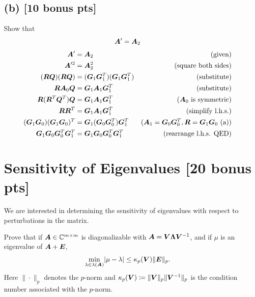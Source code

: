 \documentclass[twoside,10pt]{article}
\begin{document}
\subsection*{(b) [10 bonus pts]}
Show that
\begin{equation}
  \bm{A}' = \bm{A}_2
\end{equation}
\begin{align*}
  \bm{A}' &= \bm{A}_2&\text{(given)}\\
  \bm{A}'^2 &= \bm{A}_2^2&\text{(square both sides)}\\
  (\bm{R}\bm{Q})(\bm{R}\bm{Q}) &= (\bm{G}_1\bm{G}_1^T)(\bm{G}_1\bm{G}_1^T)&\text{(substitute)}\\
  \bm{R}\bm{A}_0\bm{Q} &= \bm{G}_1\bm{A}_1\bm{G}_1^T&\text{(substitute)}\\
  \bm{R}(\bm{R}^T\bm{Q}^T)\bm{Q} &= \bm{G}_1\bm{A}_1\bm{G}_1^T&\text{($\bm{A}_0$ is symmetric)}\\
  \bm{R}\bm{R}^T &= \bm{G}_1\bm{A}_1\bm{G}_1^T&\text{(simplify l.h.s.)}\\
  (\bm{G}_1 \bm{G}_0)(\bm{G}_1 \bm{G}_0)^T &= \bm{G}_1(\bm{G}_0 \bm{G}_0^T)\bm{G}_1^T&\text{($\bm{A}_{1} = \bm{G}_0 \bm{G}_0^T, \bm{R} = \bm{G}_1\bm{G}_0$ (a))}\\
  \bm{G}_1 \bm{G}_0\bm{G}_0^T \bm{G}_1^T &= \bm{G}_1\bm{G}_0 \bm{G}_0^T\bm{G}_1^T&\text{(rearrange l.h.s. QED)}\\
\end{align*}

\section{Sensitivity of Eigenvalues [20 bonus pts]}
We are interested in determining the sensitivity of eigenvalues with respect to perturbations in the matrix.

Prove that if $\bm{A} \in \mathbb{C}^{m \times m}$ is diagonalizable with $\bm{A} = \bm{V} \bm{\Lambda} \bm{V}^{-1}$, and if $\mu$ is an eigenvalue of $\bm{A} + \bm{E}$, 
\begin{equation*}
  \min \limits_{\lambda \in \lambda(\mtx{A})}  \left|\mu -\lambda \right| \leq \kappa_p(\mtx{V}) \|\mtx{E}\|_p.
\end{equation*}
Here $\|\cdot\|_p$ denotes the $p$-norm and $\kappa_p(\bm{V}) \coloneqq \|\bm{V}\|_p \|\bm{V}^{-1}\|_p$ is the condition number associated with the $p$-norm. 
\end{document}
